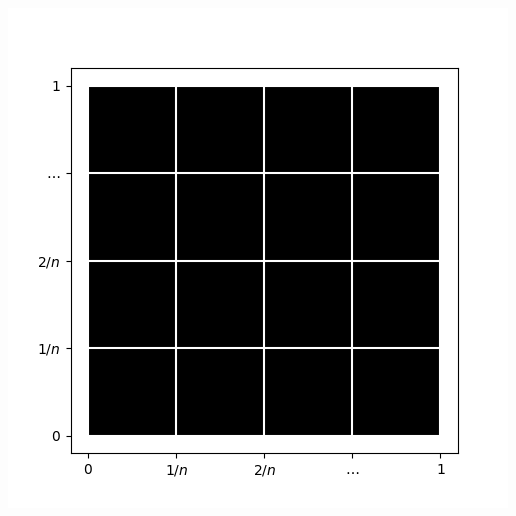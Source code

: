 \documentclass{beamer}
\begin{document}
\begin{frame}
{\begin{center}
				\includegraphics[scale=0.6]{imgs/perc_fig0.png}
			\end{center}
		}
	\end{frame}
\end{document}

